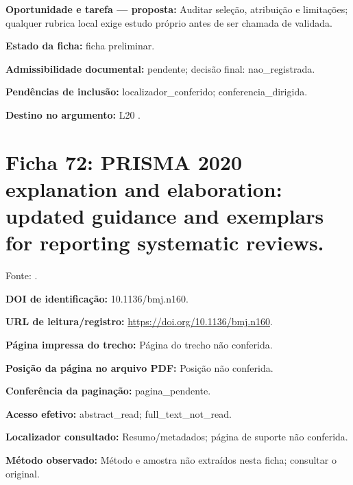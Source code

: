 \noindent\textbf{Oportunidade e tarefa — proposta:} Auditar seleção, atribuição e limitações; qualquer rubrica local exige estudo próprio antes de ser chamada de validada.\par\medskip

\noindent\textbf{Estado da ficha:} ficha preliminar.\par\medskip

\noindent\textbf{Admissibilidade documental:} pendente; decisão final: nao\_registrada.\par\medskip

\noindent\textbf{Pendências de inclusão:} localizador\_conferido; conferencia\_dirigida.\par\medskip

\noindent\textbf{Destino no argumento:} L20 .

\clearpage\section*{Ficha 72: PRISMA 2020 explanation and elaboration: updated guidance and exemplars for reporting systematic reviews.}

Fonte: \citet{SU02}.

\noindent\textbf{DOI de identificação:} 10.1136/bmj.n160.\par\medskip

\noindent\textbf{URL de leitura/registro:} \url{https://doi.org/10.1136/bmj.n160}.\par\medskip

\noindent\textbf{Página impressa do trecho:} Página do trecho não conferida.\par\medskip

\noindent\textbf{Posição da página no arquivo PDF:} Posição não conferida.\par\medskip

\noindent\textbf{Conferência da paginação:} pagina\_pendente.\par\medskip

\noindent\textbf{Acesso efetivo:} abstract\_read; full\_text\_not\_read.\par\medskip

\noindent\textbf{Localizador consultado:} Resumo/metadados; página de suporte não conferida.\par\medskip

\noindent\textbf{Método observado:} Método e amostra não extraídos nesta ficha; consultar o original.\par\medskip

